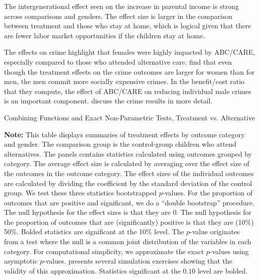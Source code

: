 The intergenerational effect seen on the increase in parental income is strong across comparisons and genders. The effect size is larger in the comparison between treatment and those who stay at home, which is logical given that there are fewer labor market opportunities if the children stay at home. 

The effects on crime highlight that females were highly impacted by ABC/CARE, especially compared to those who attended alternative care. \citet{Garcia_Heckman_Leaf_etal_2017_Comp_CBA_Unpublished} find that even though the treatment effects on the crime outcomes are larger for women than for men, the men commit more socially expensive crimes. In the benefit/cost ratio that they compute, the effect of ABC/CARE on reducing individual male crimes is an important component. \citet{Garcia_etal_2019_ECE_IMHJ} discuss the crime results in more detail.

\begin{table}[!htpb]
\begin{threeparttable}
\caption{Combining Functions and Exact Non-Parametric Tests, Treatment vs. Alternative} \label{table:massivealt}
\centering
  
\begin{tablenotes}
\footnotesize
\item \scriptsize \textbf{Note:} This table displays summaries of treatment effects by outcome category and gender. The comparison group is the control-group children who attend alternatives. The panels contains statistics calculated using outcomes grouped by category. The average effect size is calculated by averaging over the effect size of the outcomes in the outcome category. The effect sizes of the individual outcomes are calculated by dividing the coefficient by the standard deviation of the control group. We test these three statistics bootstrapped $p$-values. For the proportion of outcomes that are positive and significant, we do a ``double bootstrap'' procedure. The null hypothesis for the effect sizes is that they are 0. The null hypothesis for the proportion of outcomes that are (significantly) positive is that they are (10\%) 50\%. Bolded statistics are significant at the 10\% level. The \citet{Rosenbaum_2005_Distribution_JRSS} $p$-value originates from a test where the null is a common joint distribution of the variables in each category. For computational simplicity, we approximate the exact $p$-values using asymptotic $p$-values. \citet{Rosenbaum_2005_Distribution_JRSS} presents several simulation exercises showing that the validity of this approximation. Statistics significant at the $0.10$ level are bolded.
\end{tablenotes}
\end{threeparttable}
\end{table}


